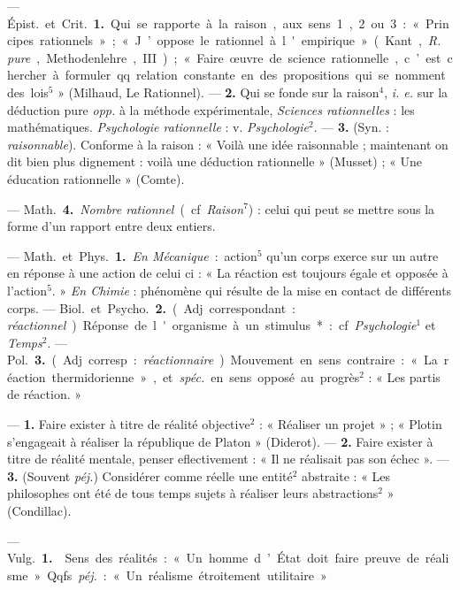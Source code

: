 \begin{itemize}[leftmargin=1cm, label=, itemsep=1pt]
 — \si{Épist.} et \si{Crit.} {\bf 1.} Qui se rapporte à la
raison, aux sens 1, 2 ou 3 : « Principes rationnels » ; « J’oppose le
rationnel à l'empirique » (Kant, {\it R. pure}, Methodenlehre, III) ; « Faire
œuvre de science rationnelle, c’est chercher à formuler qq. relation
constante en des propositions qui se nomment des lois$^5$ » (Milhaud, Le
Rationnel). —  {\bf 2.} Qui se fonde sur la raison$^4$, {\it i. e.} sur la
déduction pure {\it opp.} à la méthode expérimentale, {\it Sciences
rationnelles} : les mathématiques. {\it Psychologie rationnelle} : v. {\it
Psychologie}$^2$. — {\bf 3.} (Syn. : {\it raisonnable}). Conforme à la
raison : « Voilà une idée raisonnable ; maintenant on dit bien plus
dignement : voilà une déduction rationnelle » (Musset) ; « Une éducation
rationnelle » (Comte).

— \si{Math.} {\bf 4.} {\it Nombre rationnel} (cf. {\it Raison}$^7$) : celui
qui peut se mettre sous la forme d’un rapport entre deux entiers.

 — \si{Math.} et \si{Phys.} {\bf 1.} {\it En Mécanique} :
action$^5$ qu’un corps exerce sur un autre en réponse à une action de celui
ci : « La réaction est toujours égale et opposée à l'action$^5$. » {\it En
Chimie} : phénomène qui résulte de la mise en contact de différents corps. —
\si{Biol.} et \si{Psycho.}  {\bf 2.} (Adj. correspondant : {\it
réactionnel}). Réponse de l'organisme à un stimulus* : cf.
{\it Psychologie}$^1$ et {\it Temps}$^2$. — \si{Pol.} {\bf 3.} (Adj.
corresp. : {\it réactionnaire}). Mouvement en sens contraire : « La réaction
thermidorienne », et {\it spéc.} en sens opposé au progrès$^2$ : « Les partis de réaction. »

 — {\bf 1.} Faire exister à titre de réalité objective$^2$ : «
Réaliser un projet » ; « Plotin s'engageait à réaliser la république de
Platon » (Diderot). — {\bf 2.} Faire exister à titre de réalité mentale,
penser eflectivement : « Il ne réalisait pas son échec ». — {\bf 3.} (Souvent
{\it péj.}) Considérer comme réelle une entité$^2$ abstraite : « Les
philosophes ont été de tous temps sujets à réaliser leurs abstractions$^2$
» (Condillac).

 — \si{Vulg.} {\bf 1.}  Sens des réalités : « Un
homme d’État doit faire preuve de réalisme. » Qqfs. {\it péj.} : « Un
réalisme étroitement utilitaire. »


\end{itemize}
